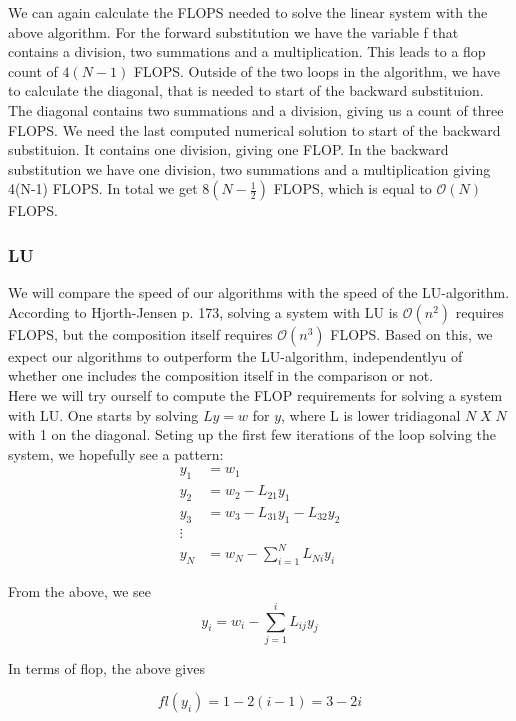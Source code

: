 \documentclass{article}
\begin{document}
We can again calculate the FLOPS needed to solve the linear system with the above algorithm. For the forward substitution we have the variable f that contains a division, two summations and a multiplication. This leads to a flop count of $4(N-1)$ FLOPS. Outside of the two loops in the algorithm, we have to calculate the diagonal, that is needed to start of the backward substituion. The diagonal contains two summations and a division, giving us a count of three FLOPS. We need the last computed numerical solution to start of the backward substituion. It contains one division, giving one FLOP. In the backward substitution we have one division, two summations and a multiplication giving 4(N-1) FLOPS. In total we get $8(N-\frac{1}{2})$ FLOPS, which is equal to $\mathcal{O}(N)$ FLOPS. 

\subsubsection{LU}
We will compare the speed of our algorithms with the speed of the LU-algorithm. According to Hjorth-Jensen \cite{MHJ} p. 173, solving a system with LU is $\mathcal{O}(n^2)$ requires FLOPS, but the composition itself requires  $\mathcal{O}(n^3)$ FLOPS. Based on this, we expect our algorithms to outperform the LU-algorithm, independentlyu of whether one includes the composition itself in the comparison or not.\\

Here we will try ourself to compute the FLOP requirements for solving a system with LU. One starts by solving $Ly = w$ for $y$, where L is lower tridiagonal $N\; X\; N$ with 1 on the diagonal. Seting up the first few iterations of the loop solving the system, we hopefully see a pattern:
\begin{align}
y_1 &= w_1\\
y_2 &= w_2 - L_{21} y_1\\
y_3 &= w_3 - L_{31} y_1 - L_{32}y_2\\
\vdots\\
y_{N}& = w_N - \sum_{i=1}^{N} L_{Ni} y_i
\end{align}

From the above, we see
\begin{equation}
y_i= w_i -\sum_{j=1}^{i}L_{ij}y_j
\end{equation}

In terms of flop, the above gives

\begin{equation}\label{eq:flYi}
fl(y_i) = 1 - 2(i - 1) = 3-2i
\end{equation}
\end{document}
